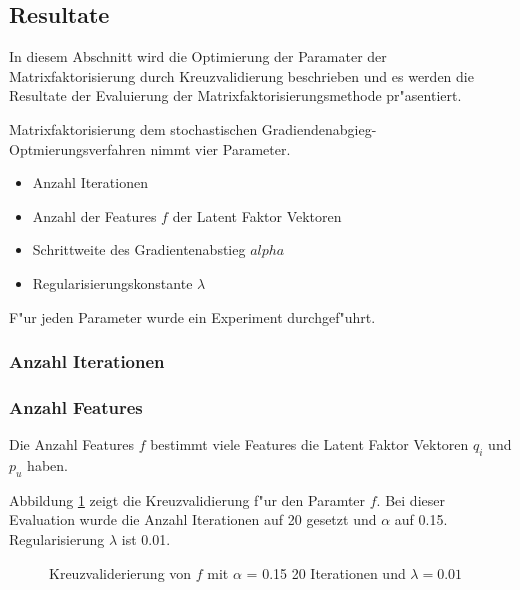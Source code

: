 \documentclass[a4paper, 12pt]{article}
\begin{document}
\subsection{Resultate}
\label{sec:matrixfactorresults}
In diesem Abschnitt wird die Optimierung der Paramater der Matrixfaktorisierung durch Kreuzvalidierung beschrieben und es werden die Resultate der Evaluierung der Matrixfaktorisierungsmethode pr"asentiert. 

Matrixfaktorisierung dem stochastischen Gradiendenabgieg-Optmierungsverfahren  nimmt vier Parameter.
\begin{itemize}
\item Anzahl Iterationen
\item Anzahl der Features $f$ der Latent Faktor Vektoren
\item Schrittweite des Gradientenabstieg $alpha$
\item Regularisierungskonstante $\lambda$
\end{itemize}

F"ur jeden Parameter wurde ein Experiment durchgef"uhrt.

\subsubsection{Anzahl Iterationen}

\begin{figure}
  \centering
{}

\end{figure}


\subsubsection{Anzahl Features}

Die Anzahl Features $f$ bestimmt viele Features die Latent Faktor Vektoren $q_i$ und $p_u$ haben.

Abbildung \ref{fig:lambda} zeigt die Kreuzvalidierung f"ur den Paramter $f$. Bei dieser Evaluation wurde die Anzahl Iterationen auf 20 gesetzt und $\alpha$ auf 0.15. Regularisierung $\lambda$ ist 0.01.

\begin{figure}
  \centering
{}
\label{fig:lambda}
\caption{Kreuzvaliderierung von $f$ mit $\alpha$ = 0.15 20 Iterationen und $\lambda=0.01$}
\end{figure}
\end{document}
